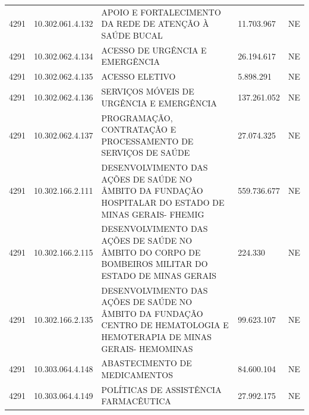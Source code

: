 \documentclass{article}
\begin{document}
\begin{longtable}[c]{m{1cm}|m{2cm}|m{10cm}|m{2cm}|m{1cm}}
\multicolumn{1}{C{1cm}|}{4291} & \multicolumn{1}{C{2cm}|}{10.302.061.4.132} & \multicolumn{1}{L{10cm}|}{APOIO E FORTALECIMENTO DA REDE DE ATENÇÃO À SAÚDE BUCAL} & \multicolumn{1}{R{2cm}|}{11.703.967} & \multicolumn{1}{C{1cm}}{NE} \\
\multicolumn{1}{C{1cm}|}{4291} & \multicolumn{1}{C{2cm}|}{10.302.062.4.134} & \multicolumn{1}{L{10cm}|}{ACESSO DE URGÊNCIA E EMERGÊNCIA} & \multicolumn{1}{R{2cm}|}{26.194.617} & \multicolumn{1}{C{1cm}}{NE} \\
\multicolumn{1}{C{1cm}|}{4291} & \multicolumn{1}{C{2cm}|}{10.302.062.4.135} & \multicolumn{1}{L{10cm}|}{ACESSO ELETIVO} & \multicolumn{1}{R{2cm}|}{5.898.291} & \multicolumn{1}{C{1cm}}{NE} \\
\multicolumn{1}{C{1cm}|}{4291} & \multicolumn{1}{C{2cm}|}{10.302.062.4.136} & \multicolumn{1}{L{10cm}|}{SERVIÇOS MÓVEIS DE URGÊNCIA E EMERGÊNCIA} & \multicolumn{1}{R{2cm}|}{137.261.052} & \multicolumn{1}{C{1cm}}{NE} \\
\multicolumn{1}{C{1cm}|}{4291} & \multicolumn{1}{C{2cm}|}{10.302.062.4.137} & \multicolumn{1}{L{10cm}|}{PROGRAMAÇÃO, CONTRATAÇÃO E PROCESSAMENTO DE SERVIÇOS DE SAÚDE} & \multicolumn{1}{R{2cm}|}{27.074.325} & \multicolumn{1}{C{1cm}}{NE} \\
\multicolumn{1}{C{1cm}|}{4291} & \multicolumn{1}{C{2cm}|}{10.302.166.2.111} & \multicolumn{1}{L{10cm}|}{DESENVOLVIMENTO DAS AÇÕES DE SAÚDE NO ÂMBITO DA FUNDAÇÃO HOSPITALAR DO ESTADO DE MINAS GERAIS- FHEMIG} & \multicolumn{1}{R{2cm}|}{559.736.677} & \multicolumn{1}{C{1cm}}{NE} \\
\multicolumn{1}{C{1cm}|}{4291} & \multicolumn{1}{C{2cm}|}{10.302.166.2.115} & \multicolumn{1}{L{10cm}|}{DESENVOLVIMENTO DAS AÇÕES DE SAÚDE NO ÂMBITO DO CORPO DE BOMBEIROS MILITAR DO ESTADO DE MINAS GERAIS} & \multicolumn{1}{R{2cm}|}{224.330} & \multicolumn{1}{C{1cm}}{NE} \\
\multicolumn{1}{C{1cm}|}{4291} & \multicolumn{1}{C{2cm}|}{10.302.166.2.135} & \multicolumn{1}{L{10cm}|}{DESENVOLVIMENTO DAS AÇÕES DE SAÚDE NO ÂMBITO DA FUNDAÇÃO CENTRO DE HEMATOLOGIA E HEMOTERAPIA DE MINAS GERAIS- HEMOMINAS} & \multicolumn{1}{R{2cm}|}{99.623.107} & \multicolumn{1}{C{1cm}}{NE} \\
\multicolumn{1}{C{1cm}|}{4291} & \multicolumn{1}{C{2cm}|}{10.303.064.4.148} & \multicolumn{1}{L{10cm}|}{ABASTECIMENTO DE MEDICAMENTOS} & \multicolumn{1}{R{2cm}|}{84.600.104} & \multicolumn{1}{C{1cm}}{NE} \\
\multicolumn{1}{C{1cm}|}{4291} & \multicolumn{1}{C{2cm}|}{10.303.064.4.149} & \multicolumn{1}{L{10cm}|}{POLÍTICAS DE ASSISTÊNCIA FARMACÊUTICA} & \multicolumn{1}{R{2cm}|}{27.992.175} & \multicolumn{1}{C{1cm}}{NE} \\

\end{longtable}
\end{document}
